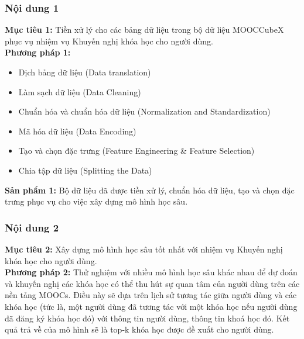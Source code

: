 \subsubsection{Nội dung 1}
\textbf{Mục tiêu 1:} Tiền xử lý cho các bảng dữ liệu trong bộ dữ liệu MOOCCubeX phục vụ nhiệm vụ Khuyến nghị khóa học cho người dùng.\\
\textbf{Phương pháp 1:}
\begin{itemize}
    \item Dịch bảng dữ liệu (Data translation)
    \item Làm sạch dữ liệu (Data Cleaning)
    \item Chuẩn hóa và chuẩn hóa dữ liệu (Normalization and Standardization)
    \item Mã hóa dữ liệu (Data Encoding)
    \item Tạo và chọn đặc trưng (Feature Engineering \& Feature Selection)
    \item Chia tập dữ liệu (Splitting the Data)
\end{itemize}
\textbf{Sản phẩm 1:} Bộ dữ liệu đã được tiền xử lý, chuẩn hóa dữ liệu, tạo và chọn đặc trưng phục vụ cho việc xây dựng mô hình học sâu.\\
\subsubsection{Nội dung 2}
\textbf{Mục tiêu 2:} Xây dựng mô hình học sâu tốt nhất với nhiệm vụ Khuyến nghị khóa học cho người dùng.\\
\textbf{Phương pháp 2:} Thử nghiệm với nhiều mô hình học sâu khác nhau để dự đoán
và khuyến nghị các khóa học có thể thu hút sự quan tâm của người dùng trên
các nền tảng MOOCs. Điều này sẽ dựa trên lịch sử tương tác giữa người dùng
và các khóa học (tức là, một người dùng đã tương tác với một khóa học nếu
người dùng đã đăng ký khóa học đó) với thông tin người dùng, thông tin khoá học đó. 
Kết quả trả về của mô hình sẽ là top-k khóa học được đề xuất cho người dùng.

